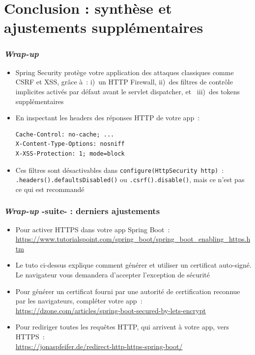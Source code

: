\documentclass{beamer}
\begin{document}
\section{Conclusion : synthèse et ajustements supplémentaires}

\begin{frame}[fragile]
	\frametitle{\textit{Wrap-up}}
	\begin{itemize}
		\item Spring Security protège votre application des attaques classiques comme CSRF et XSS, grâce à~: i)~un HTTP Firewall, ii)~des filtres de contrôle implicites activés par défaut avant le servlet dispatcher, et ~iii)~des tokens supplémentaires
		\item En inspectant les headers des réponses HTTP de votre app~:
\begin{lstlisting}
Cache-Control: no-cache; ...
X-Content-Type-Options: nosniff
X-XSS-Protection: 1; mode=block
\end{lstlisting}
		\item Ces filtres sont désactivables dans \texttt{configure(HttpSecurity http)}~: \texttt{.headers().defaultsDisabled()} ou \texttt{.csrf().disable()}, mais ce n'est pas ce qui est recommandé
	\end{itemize}
\end{frame}


\begin{frame}[fragile]
\frametitle{\textit{Wrap-up} -suite- : derniers ajustements}
\begin{itemize}		
		\item Pour activer HTTPS dans votre app Spring Boot~: \footnotesize \url{https://www.tutorialspoint.com/spring_boot/spring_boot_enabling_https.htm}
		\normalsize
		\item Le tuto ci-dessus explique comment générer et utiliser un certificat auto-signé. Le navigateur vous demandera d'accepter l'exception de sécurité
		\item Pour générer un certificat fourni par une autorité de certification reconnue par les navigateurs, compléter votre app~:\\
		\footnotesize
		\url{https://dzone.com/articles/spring-boot-secured-by-lets-encrypt}
		\normalsize
		\item Pour rediriger toutes les requêtes HTTP, qui arrivent à votre app, vers HTTPS~:\\ \footnotesize
		\url{https://jonaspfeifer.de/redirect-http-https-spring-boot/}
		\normalsize
	\end{itemize}
\end{frame}
\end{document}
